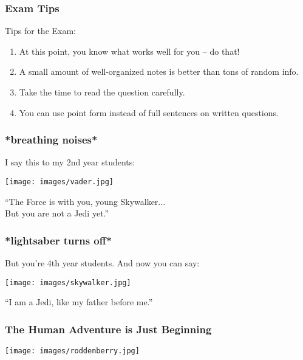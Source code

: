 \begin{frame}
\frametitle{Exam Tips}

Tips for the Exam:

\begin{enumerate}
	\item At this point, you know what works well for you -- do that!
	\item A small amount of well-organized notes is better than tons of random info.
	\item Take the time to read the question carefully.
	\item You can use point form instead of full sentences on written questions.
\end{enumerate}

\end{frame}


\begin{frame}
\frametitle{*breathing noises*}

I say this to my 2nd year students:

\begin{center}
	\texttt{[image: images/vader.jpg]}
\end{center}

``The Force is with you, young Skywalker...\\
\quad But you are not a Jedi yet.''


\end{frame}


\begin{frame}
\frametitle{*lightsaber turns off*}

But you're 4th year students. And now you can say:
\begin{center}
	\texttt{[image: images/skywalker.jpg]}
\end{center}

``I am a Jedi, like my father before me.''

\end{frame}


\begin{frame}
\frametitle{The Human Adventure is Just Beginning}

\begin{center}
	\texttt{[image: images/roddenberry.jpg]}
\end{center}

\end{frame}




